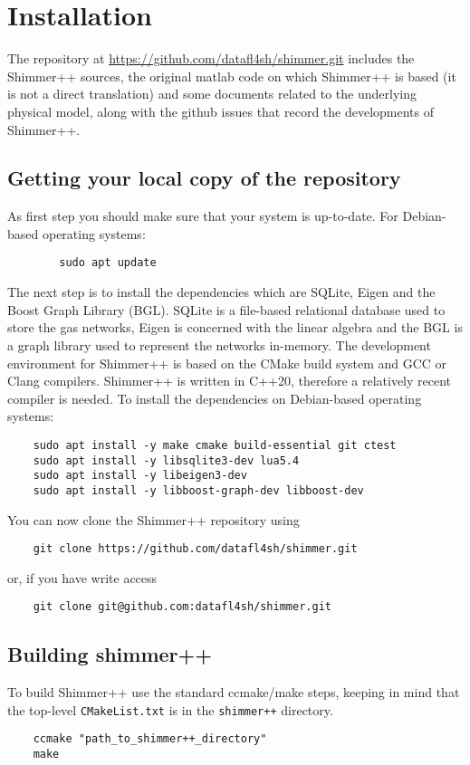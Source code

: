 \section{Installation}

The repository at \url{https://github.com/datafl4sh/shimmer.git} includes the Shimmer++ sources, the original matlab code on which Shimmer++ is based (it is not a direct translation) and some documents related to the underlying physical model, along with the github issues that record the developments of Shimmer++.  
\subsection{Getting your local copy of the repository}
As first step you should make sure that your system is up-to-date. For Debian-based operating systems: 
    \begin{verbatim}
        sudo apt update
    \end{verbatim}    
The next step is to install the dependencies which are SQLite, Eigen and the Boost Graph Library (BGL). SQLite is a file-based relational database used to store the gas networks, Eigen is concerned with the linear algebra and the BGL is a graph library used to represent the networks in-memory. The development environment for Shimmer++ is based on the CMake build system and GCC or Clang compilers. Shimmer++ is written in C++20, therefore a relatively recent compiler is needed.
To install the dependencies on Debian-based operating systems:
\begin{verbatim}
    sudo apt install -y make cmake build-essential git ctest
    sudo apt install -y libsqlite3-dev lua5.4
    sudo apt install -y libeigen3-dev
    sudo apt install -y libboost-graph-dev libboost-dev
\end{verbatim}
You can now clone the Shimmer++ repository using
\begin{verbatim}        
    git clone https://github.com/datafl4sh/shimmer.git
\end{verbatim}
or, if you have write access
\begin{verbatim}
    git clone git@github.com:datafl4sh/shimmer.git
\end{verbatim}

\subsection{Building shimmer++}
To build Shimmer++ use the standard ccmake/make steps, keeping in mind that the top-level \texttt{CMakeList.txt} is in the \texttt{shimmer++} directory.
\begin{verbatim}
    ccmake "path_to_shimmer++_directory"         
    make  
\end{verbatim}


